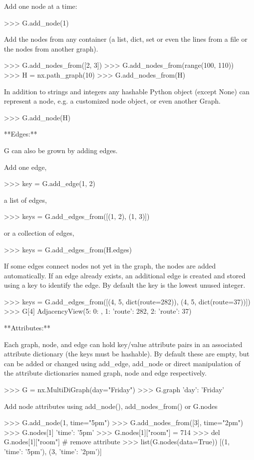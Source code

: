 \begin{DoxyVerb}
Add one node at a time:

>>> G.add_node(1)

Add the nodes from any container (a list, dict, set or
even the lines from a file or the nodes from another graph).

>>> G.add_nodes_from([2, 3])
>>> G.add_nodes_from(range(100, 110))
>>> H = nx.path_graph(10)
>>> G.add_nodes_from(H)

In addition to strings and integers any hashable Python object
(except None) can represent a node, e.g. a customized node object,
or even another Graph.

>>> G.add_node(H)

**Edges:**

G can also be grown by adding edges.

Add one edge,

>>> key = G.add_edge(1, 2)

a list of edges,

>>> keys = G.add_edges_from([(1, 2), (1, 3)])

or a collection of edges,

>>> keys = G.add_edges_from(H.edges)

If some edges connect nodes not yet in the graph, the nodes
are added automatically.  If an edge already exists, an additional
edge is created and stored using a key to identify the edge.
By default the key is the lowest unused integer.

>>> keys = G.add_edges_from([(4, 5, dict(route=282)), (4, 5, dict(route=37))])
>>> G[4]
AdjacencyView({5: {0: {}, 1: {'route': 282}, 2: {'route': 37}}})

**Attributes:**

Each graph, node, and edge can hold key/value attribute pairs
in an associated attribute dictionary (the keys must be hashable).
By default these are empty, but can be added or changed using
add_edge, add_node or direct manipulation of the attribute
dictionaries named graph, node and edge respectively.

>>> G = nx.MultiDiGraph(day="Friday")
>>> G.graph
{'day': 'Friday'}

Add node attributes using add_node(), add_nodes_from() or G.nodes

>>> G.add_node(1, time="5pm")
>>> G.add_nodes_from([3], time="2pm")
>>> G.nodes[1]
{'time': '5pm'}
>>> G.nodes[1]["room"] = 714
>>> del G.nodes[1]["room"]  # remove attribute
>>> list(G.nodes(data=True))
[(1, {'time': '5pm'}), (3, {'time': '2pm'})]


\end{DoxyVerb}
